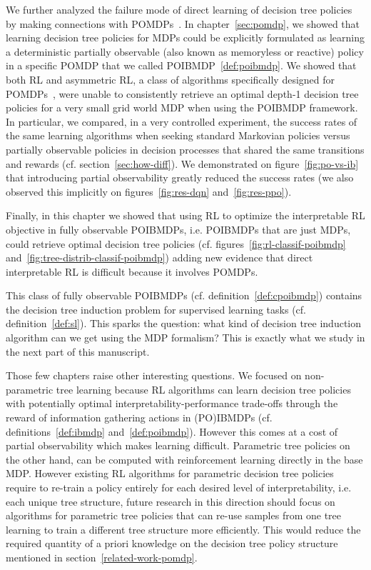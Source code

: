 We further analyzed the failure mode of direct learning of decision tree policies by making connections with POMDPs~\cite{POMDP,chap2}.
In chapter~\ref{sec:pomdp}, we showed that learning decision tree policies for MDPs could be explicitly formulated as learning a deterministic partially observable (also known as memoryless or reactive) policy in a specific POMDP that we called POIBMDP~\ref{def:poibmdp}.
We showed that both RL and asymmetric RL, a class of algorithms specifically designed for POMDPs~\cite{baisero-ppo,baisero-dqn}, were unable to consistently retrieve an optimal depth-1 decision tree policies for a very small grid world MDP when using the POIBMDP framework.
In particular, we compared, in a very controlled experiment, the success rates of the same learning algorithms when seeking standard Markovian policies versus partially observable policies in decision processes that shared the same transitions and rewards (cf. section~\ref{sec:how-diff}).
We demonstrated on figure~\ref{fig:po-vs-ib} that introducing partial observability greatly reduced the success rates (we also observed this implicitly on figures~\ref{fig:res-dqn} and~\ref{fig:res-ppo}).  

Finally, in this chapter we showed that using RL to optimize the interpretable RL objective in fully observable POIBMDPs, i.e. POIBMDPs that are just MDPs, could retrieve optimal decision tree policies (cf. figures~\ref{fig:rl-classif-poibmdp} and~\ref{fig:tree-distrib-classif-poibmdp}) adding new evidence that direct interpretable RL is difficult because it involves POMDPs.

This class of fully observable POIBMDPs (cf. definition~\ref{def:cpoibmdp}) contains the decision tree induction problem for supervised learning tasks (cf. definition~\ref{def:sl}).
This sparks the question: what kind of decision tree induction algorithm can we get using the MDP formalism?
This is exactly what we study in the next part of this manuscript.

Those few chapters raise other interesting questions.
We focused on non-parametric tree learning because RL algorithms can learn decision tree policies with potentially optimal interpretability-performance trade-offs through the reward of information gathering actions in (PO)IBMDPs (cf. definitions~\ref{def:ibmdp} and~\ref{def:poibmdp}).
However this comes at a cost of partial observability which makes learning difficult. 
Parametric tree policies on the other hand, can be computed with reinforcement learning directly in the base MDP.
However existing RL algorithms for parametric decision tree policies~\cite{silva,vos2024optimizinginterpretabledecisiontree,sympol} require to re-train a policy entirely for each desired level of interpretability, i.e. each unique tree structure, future research in this direction should focus on algorithms for parametric tree policies that can re-use samples from one tree learning to train a different tree structure more efficiently.
This would reduce the required quantity of a priori knowledge on the decision tree policy structure mentioned in section~\ref{related-work-pomdp}.

